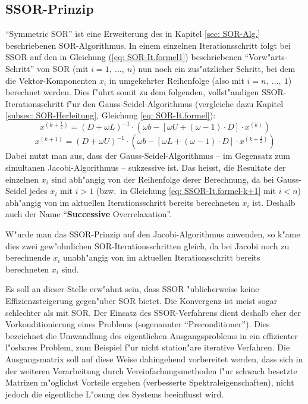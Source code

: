 \begin{refsection}
\section{SSOR-Prinzip}
``Symmetric SOR'' ist eine Erweiterung des in Kapitel \ref{sec: SOR-Alg.}
beschriebenen SOR-Algorithmus. In einem einzelnen Iterationsschritt
folgt bei SSOR auf den in Gleichung (\ref{eq: SOR-It.formel1})
beschriebenen ``Vorw"arts-Schritt'' von SOR (mit $i=1,\ ...,\ n$) nun
noch ein zus"atzlicher Schritt, bei dem die Vektor-Komponenten $x_i$ in
umgekehrter Reihenfolge (also mit $i=n,\ ...,\ 1$) berechnet werden. Dies
f"uhrt somit zu dem folgenden, vollst"andigen SSOR-Iterationsschritt
f"ur den Gauss-Seidel-Algorithmus (vergleiche dazu Kapitel \ref{subsec:
SOR-Herleitung}, Gleichung \ref{eq: SOR-It.formel}):
\begin{equation} \label{eq: SSOR-It.formel-k+1/2}
	x^{(k+\frac{1}{2})}=(D+\omega L)^{-1}\cdot(\omega b-[\omega U+(\omega-1)\cdot D]\cdot x^{(k)})
\end{equation}
\begin{equation} \label{eq: SSOR-It.formel-k+1}
	x^{(k+1)}=(D+\omega U)^{-1}\cdot(\omega b-[\omega L+(\omega-1)\cdot D]\cdot x^{(k+\frac{1}{2})})
\end{equation}
Dabei nutzt man aus, dass der Gauss-Seidel-Algorithmus -- im Gegensatz
zum simultanen Jacobi-Algorithmus -- sukzessive ist. Das heisst, die
Resultate der einzelnen $x_i$ sind abh"angig von der Reihenfolge derer
Berechnung, da bei Gauss-Seidel jedes $x_i$ mit $i>1$ (bzw.~in Gleichung
\ref{eq: SSOR-It.formel-k+1} mit $i<n$) abh"angig von im aktuellen
Iterationsschritt bereits berechneten $x_i$ ist. Deshalb auch der Name
``\textbf{Successive} Overrelaxation''.

W"urde man das SSOR-Prinzip auf den Jacobi-Algorithmus anwenden, so k"ame
dies zwei gew"ohnlichen SOR-Iterationsschritten gleich, da bei Jacobi
noch zu berechnende $x_i$ unabh"angig von im aktuellen Iterationsschritt
bereits berechneten $x_i$ sind.

Es soll an dieser Stelle erw"ahnt sein, dass SSOR "ublicherweise keine
Effizienzsteigerung gegen"uber SOR bietet. Die Konvergenz ist meist sogar
schlechter als mit SOR. Der Einsatz des SSOR-Verfahrens dient deshalb
eher der Vorkonditionierung \cite{Vorkonditionierung_Dorn} eines Problems
(sogenannter ``Preconditioner''). Dies bezeichnet die Umwandlung des
eigentlichen Ausgangsproblems in ein effizienter l"osbares Problem, zum
Beispiel f"ur nicht station"are iterative Verfahren. Die Ausgangsmatrix
soll auf diese Weise dahingehend vorbereitet werden, dass sich in der
weiteren Verarbeitung durch Vereinfachungsmethoden f"ur schwach besetzte
Matrizen m"oglichst Vorteile ergeben (verbesserte Spektraleigenschaften),
nicht jedoch die eigentliche L"osung des Systems beeinflusst wird.

\printbibliography[heading=subbibliography]
\end{refsection}
